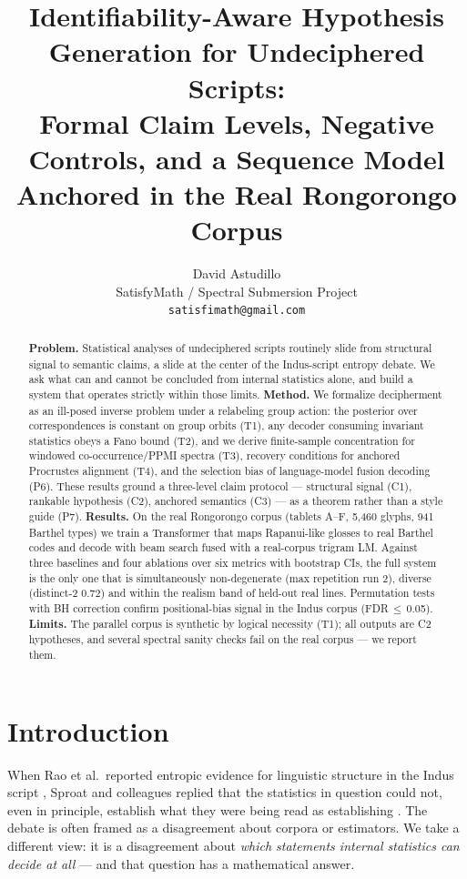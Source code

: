 \documentclass[10pt,twocolumn]{article}
\title{\bfseries Identifiability-Aware Hypothesis Generation for Undeciphered
Scripts:\\ Formal Claim Levels, Negative Controls, and a Sequence Model\\
Anchored in the Real Rongorongo Corpus}
\author{David Astudillo\\
\normalsize SatisfyMath / Spectral Submersion Project\\
\normalsize \texttt{satisfimath@gmail.com}}
\date{}
\newcommand{\Cone}{\textsf{C1}}
\newcommand{\Ctwo}{\textsf{C2}}
\newcommand{\Cthree}{\textsf{C3}}
\begin{document}
\maketitle

\begin{abstract}
\textbf{Problem.} Statistical analyses of undeciphered scripts routinely
slide from structural signal to semantic claims, a slide at the center of
the Indus-script entropy debate. We ask what can and cannot be concluded
from internal statistics alone, and build a system that operates strictly
within those limits. \textbf{Method.} We formalize decipherment as an
ill-posed inverse problem under a relabeling group action: the posterior
over correspondences is constant on group orbits (T1), any decoder
consuming invariant statistics obeys a Fano bound (T2), and we derive
finite-sample concentration for windowed co-occurrence/PPMI spectra (T3),
recovery conditions for anchored Procrustes alignment (T4), and the
selection bias of language-model fusion decoding (P6). These results
ground a three-level claim protocol --- structural signal (\Cone),
rankable hypothesis (\Ctwo), anchored semantics (\Cthree) --- as a
theorem rather than a style guide (P7). \textbf{Results.} On the real
Rongorongo corpus (tablets A--F, 5{,}460 glyphs, 941 Barthel types) we
train a Transformer that maps Rapanui-like glosses to real Barthel codes
and decode with beam search fused with a real-corpus trigram LM. Against
three baselines and four ablations over six metrics with bootstrap CIs,
the full system is the only one that is simultaneously non-degenerate
(max repetition run 2), diverse (distinct-2 $0.72$) and within the
realism band of held-out real lines. Permutation tests with BH
correction confirm positional-bias signal in the Indus corpus
(FDR\,$\le$\,0.05). \textbf{Limits.} The parallel corpus is synthetic by
logical necessity (T1); all outputs are \Ctwo{} hypotheses, and several
spectral sanity checks fail on the real corpus --- we report them.
\end{abstract}

\section{Introduction}
\label{sec:intro}

When Rao et al.\ reported entropic evidence for linguistic structure in
the Indus script \cite{rao2009}, Sproat and colleagues replied that the
statistics in question could not, even in principle, establish what they
were being read as establishing \cite{sproat2010,farmer2004}. The debate
is often framed as a disagreement about corpora or estimators. We take a
different view: it is a disagreement about \emph{which statements
internal statistics can decide at all} --- and that question has a
mathematical answer.
\end{document}
